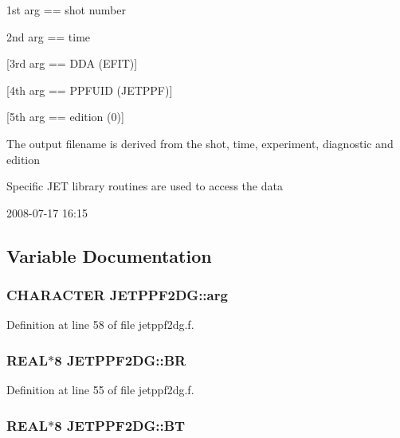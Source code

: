 1st arg == shot number

2nd arg == time

\mbox{[}3rd arg == DDA (EFIT)\mbox{]}

\mbox{[}4th arg == PPFUID (JETPPF)\mbox{]}

\mbox{[}5th arg == edition (0)\mbox{]}

The output filename is derived from the shot, time, experiment, diagnostic and edition

Specific JET library routines are used to access the data

\begin{Desc}
\item[Version:]2008-07-17 16:15 \end{Desc}


\subsection{Variable Documentation}
\hypertarget{namespaceJETPPF2DG_359c6fe9b150c29087e3c047ff7a6701}{
\subsubsection[arg]{\setlength{\rightskip}{0pt plus 5cm}CHARACTER {\bf JETPPF2DG::arg}}}
\label{namespaceJETPPF2DG_359c6fe9b150c29087e3c047ff7a6701}




Definition at line 58 of file jetppf2dg.f.\hypertarget{namespaceJETPPF2DG_e35362876d621deef2d3119b6bec9e86}{
\subsubsection[BR]{\setlength{\rightskip}{0pt plus 5cm}REAL$\ast$8 {\bf JETPPF2DG::BR}}}
\label{namespaceJETPPF2DG_e35362876d621deef2d3119b6bec9e86}




Definition at line 55 of file jetppf2dg.f.\hypertarget{namespaceJETPPF2DG_1f8b39341692faac86ea6fbb52b03493}{
\subsubsection[BT]{\setlength{\rightskip}{0pt plus 5cm}REAL$\ast$8 {\bf JETPPF2DG::BT}}}
\label{namespaceJETPPF2DG_1f8b39341692faac86ea6fbb52b03493}




